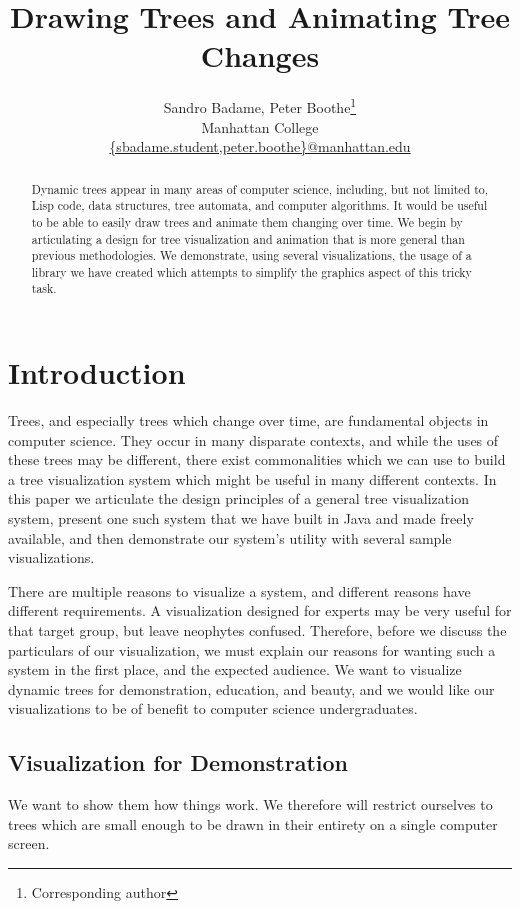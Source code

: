 \documentclass{article}
\title{Drawing Trees and Animating Tree Changes}
\author{Sandro Badame, Peter Boothe\footnote{Corresponding author}\\
 Manhattan College\\
\url{{sbadame.student,peter.boothe}@manhattan.edu}}
\begin{document}
\maketitle

\begin{abstract}
Dynamic trees appear in many areas of computer science, including, but not
limited to, Lisp code, data structures, tree automata, and computer algorithms.
It would be useful to be able to easily draw trees and animate them changing
over time.  We begin by articulating a design for tree visualization and
animation that is more general than previous methodologies.  We demonstrate,
using several visualizations, the usage of a library we have created which
attempts to simplify the graphics aspect of this tricky task.\end{abstract}

\section{Introduction}
Trees, and especially trees which change over time, are fundamental objects in
computer science.  They occur in many disparate contexts, and while the uses of
these trees may be different, there exist commonalities which we can use to
build a tree visualization system which might be useful in many different
contexts.  In this paper we articulate the design principles of a general tree visualization system, present one such system that we have built in Java and made freely available, and then demonstrate our system's utility with several sample visualizations.

There are multiple reasons to visualize a system, and different reasons have
different requirements.  A visualization designed for experts may be very
useful for that target group, but leave neophytes confused.  Therefore, before
we discuss the particulars of our visualization, we must explain our reasons
for wanting such a system in the first place, and the expected audience.  We
want to visualize dynamic trees for demonstration, education, and beauty, and
we would like our visualizations to be of benefit to computer science
undergraduates.

\subsection{Visualization for Demonstration}

We want to show them how things work.  We therefore will restrict ourselves to trees which are small enough to be drawn in their entirety on a single computer screen.
\end{document}
